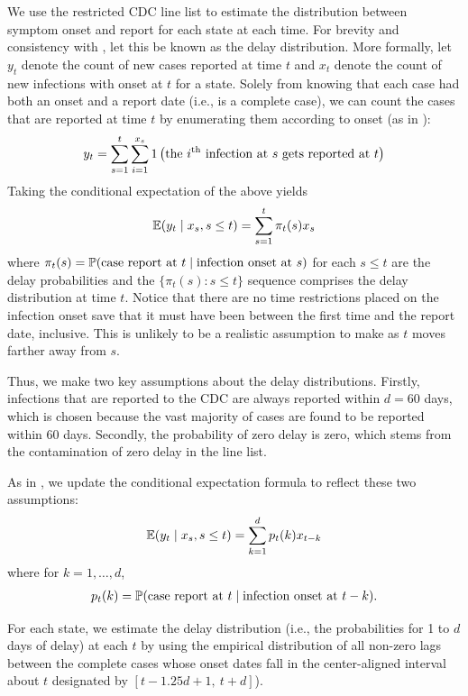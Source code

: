 \documentclass{article}
\begin{document}
We use the restricted CDC line list to estimate the distribution between symptom
onset and report for each state at each time. For brevity and consistency with
\citet{jahja2022real}, let this be known as the delay distribution. More
formally, let $y_t$ denote the count of new cases reported at time $t$ and $x_t$
denote the count of new infections with onset at $t$ for a state. Solely from
knowing that each case had both an onset and a report date (i.e., is a complete
case), we can count the cases that are reported at time $t$ by enumerating
them according to onset (as in \citealp{jahja2022real}):
\begin{align*}
y_t = \sum_{s=1}^{t} \sum_{i=1}^{x_s}1 \left ( \text{the }i\th\text{ infection at }
 s \text{ gets reported at }t \right )
\end{align*}
Taking the conditional expectation of the above yields
\begin{align*}
\E(y_t \mid x_s, s \leq t) = \sum_{s=1}^{t} \pi_t(s) x_s 
\end{align*}
where $\pi_t(s) = \P(\text{case report at }t \mid \text{infection onset at }s)$ for
each $s \leq t$ are the delay probabilities and the $\{ \pi_t(s) : s \leq t
\}$ sequence comprises the delay distribution at time $t$. Notice that
there are no time restrictions placed on the infection onset save that it must
have been between the first time and the report date, inclusive. This is
unlikely to be a realistic assumption to make as $t$ moves farther away from
$s$. 

Thus, we make two key assumptions about the delay distributions. Firstly,
infections that are reported to the CDC are always reported within $d = 60$
days, which is chosen because the vast majority of cases are found to be
reported within 60 days. Secondly, the probability of zero delay is zero,
which stems from the contamination of zero delay in the line list. 

As in \citet{jahja2022real}, we update the conditional expectation formula to
reflect these two assumptions: 
\begin{align*}
\E(y_t \mid x_s, s \leq t) = \sum_{k=1}^{d} p_t(k) x_{t-k}
\end{align*}
where for $k = 1, \dots, d$,
\begin{align*}
p_t(k) = \P(\text{case report at }t \mid \text{infection onset at }t-k).
\end{align*}

For each state, we estimate the delay distribution (i.e., the probabilities for
1 to $d$ days of delay) at each $t$ by using the empirical distribution of
all non-zero lags between the complete cases whose onset dates fall in the
center-aligned interval about $t$ designated by $[ t - 1.25d + 1,\ t + d
]$). 
\end{document}
